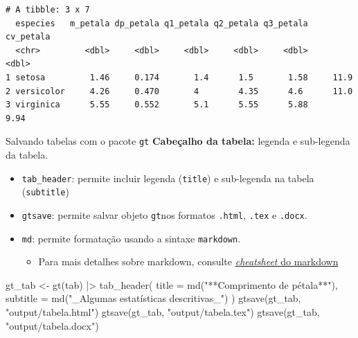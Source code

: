 \documentclass[
  10pt,
  ignorenonframetext,
]{beamer}
\newenvironment{Shaded}{\begin{snugshade}}{\end{snugshade}}
\newcommand{\AttributeTok}[1]{\textcolor[rgb]{0.40,0.45,0.13}{#1}}
\newcommand{\FunctionTok}[1]{\textcolor[rgb]{0.28,0.35,0.67}{#1}}
\newcommand{\NormalTok}[1]{\textcolor[rgb]{0.00,0.23,0.31}{#1}}
\newcommand{\OtherTok}[1]{\textcolor[rgb]{0.00,0.23,0.31}{#1}}
\newcommand{\SpecialCharTok}[1]{\textcolor[rgb]{0.37,0.37,0.37}{#1}}
\newcommand{\StringTok}[1]{\textcolor[rgb]{0.13,0.47,0.30}{#1}}
\providecommand{\tightlist}{%
  \setlength{\itemsep}{0pt}\setlength{\parskip}{0pt}}\usepackage{longtable,booktabs,array}
\begin{document}
\begin{frame}[fragile]
\scriptsize

\begin{verbatim}
# A tibble: 3 x 7
  especies   m_petala dp_petala q1_petala q2_petala q3_petala cv_petala
  <chr>         <dbl>     <dbl>     <dbl>     <dbl>     <dbl>     <dbl>
1 setosa         1.46     0.174       1.4      1.5       1.58     11.9 
2 versicolor     4.26     0.470       4        4.35      4.6      11.0 
3 virginica      5.55     0.552       5.1      5.55      5.88      9.94
\end{verbatim}

\normalsize
\end{frame}

\begin{frame}[fragile]{Salvando tabelas com o pacote \texttt{gt}}
\protect\hypertarget{salvando-tabelas-com-o-pacote-gt-2}{}
\textbf{Cabeçalho da tabela:} legenda e sub-legenda da tabela.

\begin{itemize}
\tightlist
\item
  \texttt{tab\_header}: permite incluir legenda (\texttt{title}) e
  sub-legenda na tabela (\texttt{subtitle})
\item
  \texttt{gtsave}: permite salvar objeto \texttt{gt}nos formatos
  \texttt{.html}, \texttt{.tex} e \texttt{.docx}.
\item
  \texttt{md}: permite formatação usando a sintaxe \texttt{markdown}.

  \begin{itemize}
  \tightlist
  \item
    Para mais detalhes sobre markdown, consulte
    \href{https://www.markdownguide.org/cheat-sheet}{\emph{cheatsheet}
    do markdown}
  \end{itemize}
\end{itemize}

\begin{Shaded}
\begin{Highlighting}[]
\NormalTok{gt\_tab }\OtherTok{\textless{}{-}} \FunctionTok{gt}\NormalTok{(tab) }\SpecialCharTok{|\textgreater{}}
  \FunctionTok{tab\_header}\NormalTok{(}
    \AttributeTok{title =} \FunctionTok{md}\NormalTok{(}\StringTok{"**Comprimento de pétala**"}\NormalTok{),}
    \AttributeTok{subtitle =} \FunctionTok{md}\NormalTok{(}\StringTok{"\_Algumas estatísticas descritivas\_"}\NormalTok{)}
\NormalTok{  )}
\FunctionTok{gtsave}\NormalTok{(gt\_tab, }\StringTok{"output/tabela.html"}\NormalTok{)}
\FunctionTok{gtsave}\NormalTok{(gt\_tab, }\StringTok{"output/tabela.tex"}\NormalTok{)}
\FunctionTok{gtsave}\NormalTok{(gt\_tab, }\StringTok{"output/tabela.docx"}\NormalTok{)}
\end{Highlighting}
\end{Shaded}
\end{frame}
\end{document}
